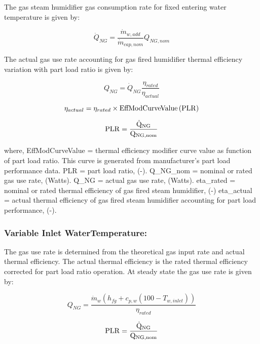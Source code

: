 The gas steam humidifier gas consumption rate for fixed entering water temperature is given by:

\begin{equation}
\dot{Q}_{NG} = \frac{\dot{m}_{w,add}}{\dot{m}_{cap,nom}}Q_{NG,nom}
\end{equation}

The actual gas use rate accounting for gas fired humidifier thermal efficiency variation with part load ratio is given by:

\begin{equation}
Q_{NG} = \dot{Q}_{NG}\frac{\eta_{rated}}{\eta_{actual}}
\end{equation}

\begin{equation}
\eta_{actual} = \eta_{rated} \times \rm{EffModCurveValue}\left(PLR\right)
\end{equation}

\begin{equation}
\rm{PLR} = \frac{\dot{Q}_{NG}}{Q_{NG,nom}}
\end{equation}

where, EffModCurveValue = thermal efficiency modifier curve value as function of part load ratio. This curve is generated from manufacturer's part load performance data. PLR = part load ratio, (-). Q\_NG\_nom = nominal or rated gas use rate, (Watts). Q\_NG = actual gas use rate, (Watts). eta\_rated = nominal or rated thermal efficiency of gas fired steam humidifier, (-) eta\_actual = actual thermal efficiency of gas fired steam humidifier accounting for part load performance, (-).

\subsubsection{Variable Inlet WaterTemperature:}\label{variable-inlet-watertemperature}

The gas use rate is determined from the theoretical gas input rate and actual thermal efficiency. The actual thermal efficiency is the rated thermal efficiency corrected for part load ratio operation. At steady state the gas use rate is given by:

\begin{equation}
Q_{NG} = \frac{\dot{m}_w \left(h_{fg}+c_{p,w}\left(100-T_{w,inlet}\right)\right)}{\eta_{rated}}
\end{equation}

\begin{equation}
\rm{PLR} = \frac{\dot{Q}_{NG}}{Q_{NG,nom}}
\end{equation}

